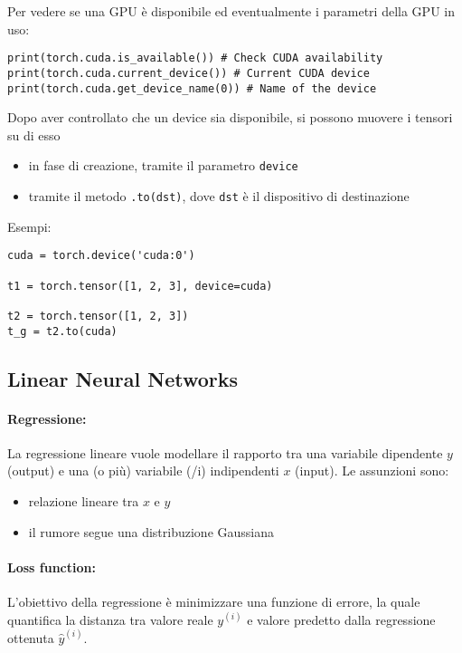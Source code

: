 Per vedere se una GPU è disponibile ed eventualmente i parametri della GPU in uso:
\begin{verbatim}
print(torch.cuda.is_available()) # Check CUDA availability
print(torch.cuda.current_device()) # Current CUDA device
print(torch.cuda.get_device_name(0)) # Name of the device
\end{verbatim}

Dopo aver controllato che un device sia disponibile, si possono muovere i tensori su di esso
\begin{itemize}
    \item in fase di creazione, tramite il parametro \texttt{device}
    
    \item tramite il metodo \texttt{.to(dst)}, dove \texttt{dst} è il dispositivo di destinazione
\end{itemize}

Esempi:
\begin{verbatim}
cuda = torch.device('cuda:0')

t1 = torch.tensor([1, 2, 3], device=cuda)

t2 = torch.tensor([1, 2, 3])
t_g = t2.to(cuda)
\end{verbatim}

\subsection{Linear Neural Networks}

\paragraph{Regressione:} La regressione lineare vuole modellare il rapporto tra una variabile dipendente $y$ (output) e una (o più) variabile (/i) indipendenti $x$ (input). Le assunzioni sono: 
\begin{itemize}
    \item relazione lineare tra $x$ e $y$
    
    \item il rumore segue una distribuzione Gaussiana
\end{itemize}

\paragraph{Loss function:} L'obiettivo della regressione è minimizzare una funzione di errore, la quale quantifica la distanza tra valore reale $y^{(i)}$ e valore predetto dalla regressione ottenuta $\hat y^{(i)}$.

